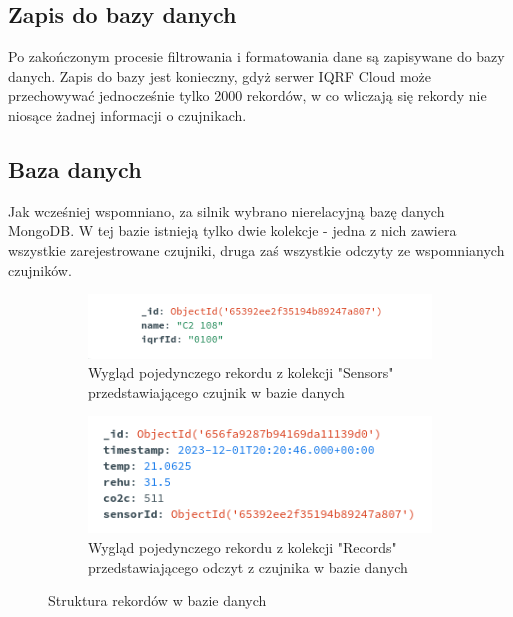 \subsection{Zapis do bazy danych}

Po zakończonym procesie filtrowania i formatowania dane są zapisywane do bazy danych. Zapis do bazy jest konieczny, gdyż serwer IQRF Cloud może przechowywać
jednocześnie tylko 2000 rekordów, w co wliczają się rekordy nie niosące żadnej informacji o czujnikach.

\subsection{Baza danych}

Jak wcześniej wspomniano, za silnik wybrano nierelacyjną bazę danych MongoDB. W tej bazie istnieją tylko dwie kolekcje - jedna z nich zawiera wszystkie zarejestrowane 
czujniki, druga zaś wszystkie odczyty ze wspomnianych czujników. 

\begin{figure}[H]
\begin{subfigure}{0.5\textwidth}
    \centering
    \includegraphics[width=\linewidth]{zdj/app/db-sensor.png}
    \caption{Wygląd pojedynczego rekordu z kolekcji "Sensors" przedstawiającego czujnik w bazie danych}
\end{subfigure}
\begin{subfigure}{0.5\textwidth}
    \centering
    \includegraphics[width=0.8\linewidth]{zdj/app/db-reading.png}
    \caption{Wygląd pojedynczego rekordu z kolekcji "Records" przedstawiającego odczyt z czujnika w bazie danych}
\end{subfigure}
   
\caption{Struktura rekordów w bazie danych}
\end{figure}


